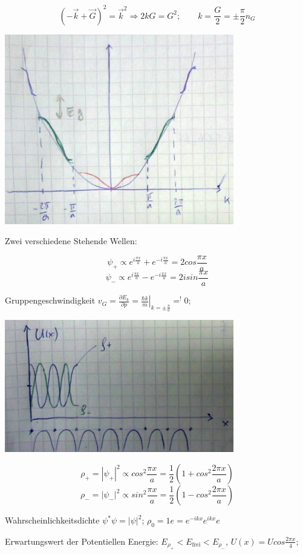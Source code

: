 \[ (-\vec k +\vec G)^2 = \vec k^2 \Rightarrow 2kG = G^2; \qquad k=\frac{G}{2}=\pm \frac{\pi}{2}n_G\]

\includegraphics[width=0.75\textwidth]{kap06_33.png}

Zwei verschiedene Stehende Wellen:

\[ \psi_+ \propto e^{i\frac{\pi x}{a}}+e^{-i\frac{\pi x}{a}}=2cos\frac{\pi x}{a} \]
\[ \psi_- \propto e^{i\frac{\pi x}{a}}-e^{-i\frac{\pi x}{a}}=2isin\frac{\pi x}{a} \]

Gruppengeschwindigkeit \(v_G = \frac{\partial E_k}{\partial p} = \left.\frac{\hbar k}{m}\right|_{k=\pm\frac{\pi}{a}}=^!0;\)

\includegraphics[width=0.75\textwidth]{kap06_34.png}

\[\rho_+=|\psi_+|^2 \propto cos^2\frac{\pi x}{a} = \frac{1}{2}(1+cos^2\frac{2\pi x}{a})\]
\[\rho_-=|\psi_-|^2 \propto sin^2\frac{\pi x}{a} = \frac{1}{2}(1-cos^2\frac{2\pi x}{a})\]


Wahrscheinlichkeitsdichte \(\psi^*\psi=|\psi|^2\); \(\rho_0=1e=e^{-ikx}e^{ikx}e\)

Erwartungswert der Potentiellen Energie: \(E_{\rho_+}<E_{\text{frei}}<E_{\rho_-}\), \(U(x)=U cos\frac{2\pi x}{4}\); 

